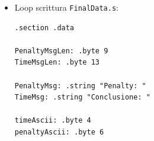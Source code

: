 \documentclass[a4paper]{report}
\begin{document}
\begin{itemize}
\begin{lstlisting}[firstnumber=130]
    movl (%esi, %eax, 1), %ecx
    movl (%esi, %ebx, 1), %edx

    movl %ecx, (%esi, %ebx, 1)
    movl %edx, (%esi, %eax, 1)

    movb $1, flag

    jmp reset

SetDurata:        # se scadenza uguale priorità uguali, controllo la durata

    addl $1, %eax    # incremento così vado da ID a durata
    addl $1, %ebx

Durata:

    movb (%esi, %eax, 1), %cl
    movb (%esi, %ebx, 1), %dl


    subl $1, %eax
    subl $1, %ebx

    cmpb %cl, %dl
    jge reset
    
    movl (%esi, %eax, 1), %ecx
    movl (%esi, %ebx, 1), %edx

    movl %ecx, (%esi, %ebx, 1)
    movl %edx, (%esi, %eax, 1)

    movb $1, flag

reset:

    addb base, %al     # resetto base
    addb base, %bl     # resetto base

next:

    cmpb $1, flag
    je Redo

    addl $4, %eax
    addl $4, %ebx
    jmp loop

Redo:                   # se ho fatto uno swap, ripeto il confronto

    movl $0, flag
    movl base, %ecx
    movl %ecx, %eax
    movl %eax, %ebx
    addl $4, %ebx

    jmp loop

endLoop:
    
    ret
    
    \end{lstlisting}


    
    \item Loop scrittura \texttt{FinalData.s}:
    
    \begin{lstlisting}[firstnumber=130]
      .section .data

PenaltyMsgLen: .byte 9
TimeMsgLen: .byte 13

PenaltyMsg: .string "Penalty: "
TimeMsg: .string "Conclusione: "

timeAscii: .byte 4
penaltyAscii: .byte 6



\end{lstlisting}
\end{itemize}
\end{document}

